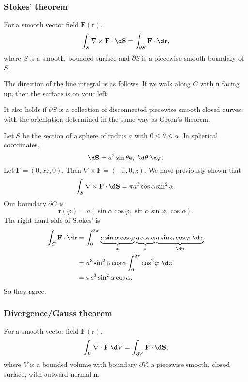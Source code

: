 \documentclass[a4paper]{article}
\begin{document}
\subsubsection{Stokes' theorem}
\begin{thm}
  For a smooth vector field $\mathbf{F}(\mathbf{r})$,
  \[
    \int_S \nabla\times \mathbf{F}\cdot \d \mathbf{S} = \int_{\partial S} \mathbf{F}\cdot \d \mathbf{r},
  \]
  where $S$ is a smooth, bounded surface and $\partial S$ is a piecewise smooth boundary of $S$.

  The direction of the line integral is as follows: If we walk along $C$ with $\mathbf{n}$ facing up, then the surface is on your left.
\end{thm}
It also holds if $\partial S$ is a collection of disconnected piecewise smooth closed curves, with the orientation determined in the same way as Green's theorem.

\begin{eg}
  Let $S$ be the section of a sphere of radius $a$ with $0 \leq \theta \leq \alpha$. In spherical coordinates,
  \[
    \d \mathbf{S} = a^2 \sin \theta \mathbf{e}_r \;\d \theta\;\d \varphi.
  \]
  Let $\mathbf{F} = (0, xz, 0)$. Then $\nabla \times \mathbf{F} = (-x, 0, z)$. We have previously shown that
  \[
    \int_S \nabla\times \mathbf{F}\cdot \d \mathbf{S} = \pi a^3 \cos\alpha\sin^2 \alpha.
  \]
  Our boundary $\partial C$ is
  \[
    \mathbf{r}(\varphi) = a(\sin \alpha\cos \varphi, \sin \alpha\sin \varphi, \cos \alpha).
  \]
  The right hand side of Stokes' is
  \begin{align*}
    \int_C \mathbf{F}\cdot \d \mathbf{r} &= \int_0^{2\pi}\underbrace{a\sin \alpha\cos \varphi}_{x}\underbrace{\vphantom{\varphi}a\cos\alpha}_z \underbrace{a\sin \alpha\cos\varphi\;\d \varphi}_{\d y}\\
    &= a^3\sin^2\alpha\cos\alpha\int_0^{2\pi}\cos^2\varphi\;\d \varphi\\
    &= \pi a^3\sin^2\alpha\cos\alpha.
  \end{align*}
  So they agree.
\end{eg}

\subsubsection{Divergence/Gauss theorem}
\begin{thm}
  For a smooth vector field $\mathbf{F}(\mathbf{r})$,
  \[
    \int _V \nabla\cdot \mathbf{F}\;\d V = \int_{\partial V}\mathbf{F}\cdot \d \mathbf{S},
  \]
  where $V$ is a bounded volume with boundary $\partial V$, a piecewise smooth, closed surface, with outward normal $\mathbf{n}$.
\end{thm}
\end{document}
